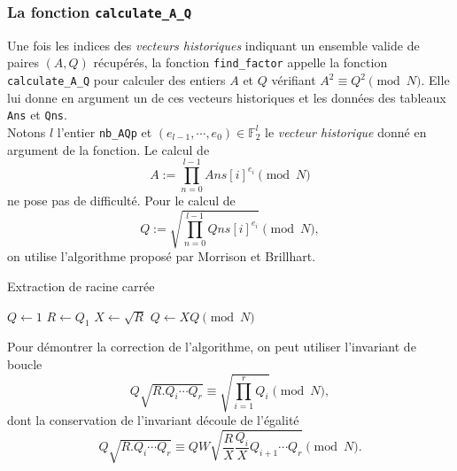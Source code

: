 \vspace{1em}

\subsubsection{La fonction \texttt{calculate\_A\_Q}}

Une fois les indices des \emph{vecteurs historiques} indiquant un ensemble
valide de paires $(A, Q)$ récupérés, la fonction \texttt{find\_factor} appelle
la fonction \texttt{calculate\_A\_Q} pour calculer des entiers $A$ et $Q$
vérifiant $A^2 \equiv Q^2 \pmod{N}$. Elle lui donne en argument un de ces
vecteurs historiques et les données des tableaux \texttt{Ans} et \texttt{Qns}.
\\

Notons $l$ l'entier \texttt{nb\_AQp} et $(e_{l-1}, \cdots , e_0) \in
\mathbb{F}_2^{l}$ le \emph{vecteur historique} donné en argument de la
fonction. Le calcul de \[A:= \prod_{n=0}^{l-1} Ans[i]^{e_i} \pmod{N} \] ne pose
pas de difficulté. Pour le calcul de \[Q:= \sqrt{\prod_{n=0}^{l-1 } Qns[i]
^{e_i}} \pmod{N},\] on utilise l'algorithme proposé par Morrison et Brillhart.

\vspace{1em}
\begin{algorithm}[H]
\DontPrintSemicolon
\caption{\sc Extraction de racine carrée}
$Q \gets 1$\;
$R \gets Q_1$\;
$X \gets \sqrt{R}$\;
    $Q \gets XQ \pmod{N}$\;
\;
\end{algorithm}
\vspace{1em}

Pour démontrer la correction de l'algorithme, on peut utiliser l'invariant de
boucle \[Q\sqrt{R.Q_i\cdots Q_r} \equiv \sqrt{\prod_{i=1}^r Q_{i}} \pmod{N},\]
dont la conservation de l'invariant découle de l'égalité \[Q\sqrt{R.Q_i\cdots
Q_r} \equiv QW \sqrt{\frac{R}{X}\frac{Q_i}{X}Q_{i+1} \cdots Q_r} \pmod{N}.\]
